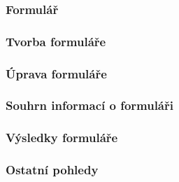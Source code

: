 		\subsubsection{Formulář} %
		
		\subsubsection{Tvorba formuláře} %
		
		\subsubsection{Úprava formuláře} %
		
		\subsubsection{Souhrn informací o formuláři} %
		
		\subsubsection{Výsledky formuláře} %
		
		\subsubsection{Ostatní pohledy} %
